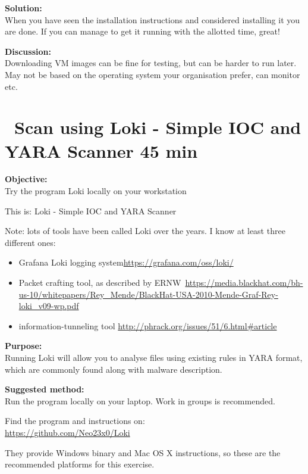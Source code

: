 \documentclass[a4paper,11pt,notitlepage]{report}
\begin{document}
{\bf Solution:}\\
When you have seen the installation instructions and considered installing it you are done. If you can manage to get it running with the allotted time, great!

{\bf Discussion:}\\
Downloading VM images can be fine for testing, but can be harder to run later. May not be based on the operating system your organisation prefer, can monitor etc.




\chapter{\faExclamationTriangle\ Scan using Loki - Simple IOC and YARA Scanner 45 min}
\label{ex:loki-ioc-yara}

{\bf Objective:}\\
Try the program Loki locally on your workstation

This is: Loki - Simple IOC and YARA Scanner

Note: lots of tools have been called Loki over the years. I know at least three different ones:
\begin{itemize}
\item Grafana Loki logging system\url{https://grafana.com/oss/loki/}
\item Packet crafting tool, as described by ERNW\
\url{https://media.blackhat.com/bh-us-10/whitepapers/Rey_Mende/BlackHat-USA-2010-Mende-Graf-Rey-loki_v09-wp.pdf}
\item information-tunneling tool \url{http://phrack.org/issues/51/6.html#article}
\end{itemize}


{\bf Purpose:}\\
Running Loki will allow you to analyse files using existing rules in YARA format, which are commonly found along with malware description.


\begin{alltt}


\end{alltt}


{\bf Suggested method:}\\
Run the program locally on your laptop. Work in groups is recommended.

Find the program and instructions on:\\
\url{https://github.com/Neo23x0/Loki}

They provide Windows binary and Mac OS X instructions, so these are the recommended platforms for this exercise.
\end{document}
